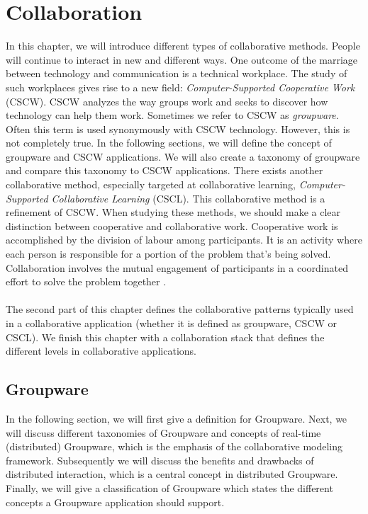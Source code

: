\chapter{Collaboration}

In this chapter, we will introduce different types of collaborative methods. People will continue to interact in new and different ways. One outcome of the marriage between technology and communication is a technical workplace. The study of such workplaces gives rise to a new field: \textit{Computer-Supported Cooperative Work} (CSCW). CSCW analyzes the way groups work and seeks to discover how technology can help them work. Sometimes we refer to CSCW as \textit{groupware}. Often this term is used synonymously with CSCW technology. However, this is not completely true. In the following sections, we will define the concept of groupware and CSCW applications. We will also create a taxonomy of groupware and compare this taxonomy to CSCW applications. There exists another collaborative method, especially targeted at collaborative learning, \textit{Computer-Supported Collaborative Learning} (CSCL). This collaborative method is a refinement of CSCW. When studying these methods, we should make a clear distinction between cooperative and collaborative work. Cooperative work is accomplished by the division of labour among participants. It is an activity where each person is responsible for a portion of the problem that's being solved. Collaboration involves the mutual engagement of participants in a coordinated effort to solve the problem together \cite{DivisionCSCL}.
\\ \\
The second part of this chapter defines the collaborative patterns typically used in a collaborative application (whether it is defined as groupware, CSCW or CSCL). We finish this chapter with a collaboration stack that defines the different levels in collaborative applications.

\section{Groupware}

In the following section, we will first give a definition for Groupware. Next, we will discuss different taxonomies of Groupware and concepts of real-time (distributed) Groupware, which is the emphasis of the collaborative modeling framework. Subsequently we will discuss the benefits and drawbacks of distributed interaction, which is a central concept in distributed Groupware. Finally, we will give a classification of Groupware which states the different concepts a Groupware application should support.

